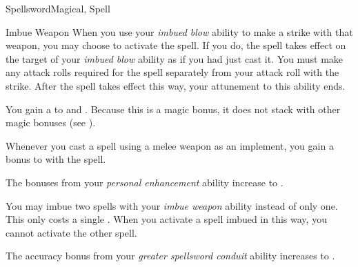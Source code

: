 \begin{feat}{Spellsword}{Magical, Spell}
\begin{attuneability}{Imbue Weapon}
            When you use your \textit{imbued blow} ability to make a strike with that weapon, you may choose to activate the spell.
            If you do, the spell takes effect on the target of your \textit{imbued blow} ability as if you had just cast it.
            You must make any attack rolls required for the spell separately from your attack roll with the strike.
            After the spell takes effect this way, your attunement to this ability ends.
        \end{attuneability}

         You gain a   to  and .
        Because this is a magic bonus, it does not stack with other magic bonuses (see ).

         Whenever you cast a spell using a melee weapon as an implement, you gain a  bonus to  with the spell.

         The bonuses from your \textit{personal enhancement} ability increase to .

         You may imbue two spells with your \textit{imbue weapon} ability instead of only one.
        This only costs a single .
        When you activate a spell imbued in this way, you  cannot activate the other spell.

         The accuracy bonus from your \textit{greater spellsword conduit} ability increases to .
    \end{feat}

